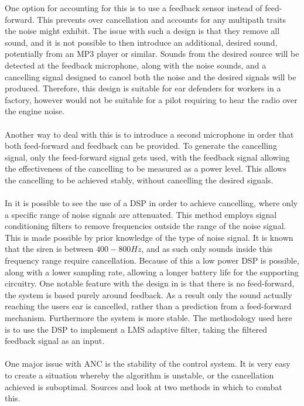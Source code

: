 One option for accounting for this is to use a feedback sensor instead of feed-forward.
This prevents over cancellation and accounts for any multipath traits the noise might exhibit.
The issue with such a design is that they remove all sound, and it is not possible to then introduce an additional, desired sound, potentially from an MP3 player or similar.
Sounds from the desired source will be detected at the feedback microphone, along with the noise sounds, and a cancelling signal designed to cancel both the noise and the desired signals will be produced.
Therefore, this design is suitable for ear defenders for workers in a factory, however would not be suitable for a pilot requiring to hear the radio over the engine noise.
\\
\\
Another way to deal with this is to introduce a second microphone \cite{EMNoiseCancel,2SensorANCAlg} in order that both feed-forward and feedback can be provided.
To generate the cancelling signal, only the feed-forward signal gets used, with the feedback signal allowing the effectiveness of the cancelling to be measured as a power level.
This allows the cancelling to be achieved stably, without cancelling the desired signals.
\\
\\
\nocite{*}
In \cite{EMHeadsets} it is possible to see the use of a DSP in order to achieve cancelling, where only a specific range of noise signals are attenuated.
This method employs signal conditioning filters to remove frequencies outside the range of the noise signal.
This is made possible by prior knowledge of the type of noise signal.
It is known that the siren is between $400-800Hz$, and as such only sounds inside this frequency range require cancellation.
Because of this a low power DSP is possible, along with a lower sampling rate, allowing a longer battery life for the supporting circuitry.
One notable feature with the design in \cite{EMHeadsets} is that there is no feed-forward, the system is based purely around feedback.
As a result only the sound actually reaching the users ear is cancelled, rather than a prediction from a feed-forward mechanism.
Furthermore the system is more stable.
The methodology used here is to use the DSP to implement a LMS adaptive filter, taking the filtered feedback signal as an input.
\\
\\
One major issue with ANC is the stability of the control system.
It is very easy to create a situation whereby the algorithm is unstable, or the cancellation achieved is suboptimal.
Sources \cite{AuralEnvironmentAdjANC} and \cite{ANCOptimalControlInf} look at two methods in which to combat this.

